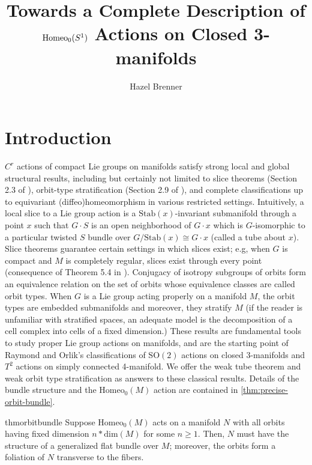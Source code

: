 \documentclass[10pt, oneside]{article}
\title{Towards a Complete Description of $\homeo$ Actions on Closed 3-manifolds}
\author{Hazel Brenner}
\newcommand{\SO}[1][2]{\text{SO}(#1)}
\newcommand{\homeo}[1][S^1]{\text{Homeo}_0(#1)}
\newcommand{\stab}[1]{\text{Stab}(#1)}
\newcommand{\dimn}[1]{\text{dim}(#1)}
\theoremstyle{definition}
\theoremstyle{definition}
\begin{document}
\maketitle
\listoftodos
\tableofcontents

\section{Introduction}\label{sec:intro}

$C^r$ actions of compact Lie groups on manifolds satisfy strong local and global structural results, including but certainly not limited to slice theorems (Section 2.3 of \cite{duistermaat:LieGroups}), orbit-type stratification (Section 2.9 of \cite{duistermaat:LieGroups}), and complete classifications up to equivariant (diffeo)homeomorphism in various restricted settings. Intuitively, a local slice to a Lie group action is a $\stab{x}$-invariant submanifold through a point $x$ such that $G\cdot S$ is an open neighborhood of $G\cdot x$ which is $G$-isomorphic to a particular twisted $S$ bundle over $G/\stab{x}\cong G\cdot x$ (called a tube about $x$). Slice theorems guarantee certain settings in which slices exist; e.g, when $G$ is compact and $M$ is completely regular, slices exist through every point (consequence of Theorem 5.4 in \cite{bredon:IntroductionCompact}). Conjugacy of isotropy subgroups of orbits form an equivalence relation on the set of orbits whose equivalence classes are called orbit types. When $G$ is a Lie group acting properly on a manifold $M$, the orbit types are embedded submanifolds and moreover, they stratify $M$ (if the reader is unfamiliar with stratified spaces, an adequate model is the decomposition of a cell complex into cells of a fixed dimension.) These results are fundamental tools to study proper Lie group actions on manifolds, and are the starting point of Raymond and Orlik's classifications of $\SO$ actions on closed 3-manifolds and $T^2$ actions on simply connected 4-manifold\cite{orlik:ActionsSO2,orlik:ActionsTorusI, orlik:ActionsTorusII}. We offer the weak tube theorem and weak orbit type stratification as answers to these classical results. Details of the bundle structure and the $\homeo[M]$ action are contained in \cref{thm:precise-orbit-bundle}.
\begin{restatable}{thm}{orbitbundle}
    \label{thm:orbit-bundle}
        Suppose $\homeo[M]$ acts on a manifold $N$ with all orbits having fixed dimension $n*\dimn{M}$ for some $n\geq 1$. Then, $N$ must have the structure of a generalized flat bundle over $M$; moreover, the orbits form a foliation of $N$ transverse to the fibers.
    \end{restatable}
\end{document}
